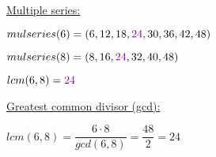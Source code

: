 \documentclass[landscape, a4paper]{article}
\begin{document}
\begin{minipage}[t]{0.198\pagewidth}
\begin{betterlist}
\begin{betterlist}
\begin{betterlist}
				\item \underline{Multiple series:}
				\begin{betterlist}
					\item $mulseries(6) = (6, 12, 18, \textcolor{PrimaryColor}{24}, 30, 36, 42, 48)$
					\item $mulseries(8) = (8, 16, \textcolor{PrimaryColor}{24}, 32, 40, 48)$
					\item $lcm(6, 8) = \textcolor{PrimaryColor}{24}$
				\end{betterlist}
			\end{betterlist}
			\begin{betterlist}
				\item \underline{Greatest common divisor (gcd):}
				\begin{betterlist}
					\item $lcm(6, 8) = \dfrac{6\cdot 8}{gcd(6, 8)} = \dfrac{48}{2} = 24$
				\end{betterlist}
			\end{betterlist}
		\end{betterlist}
	\end{betterlist}
\end{minipage}
\end{document}
